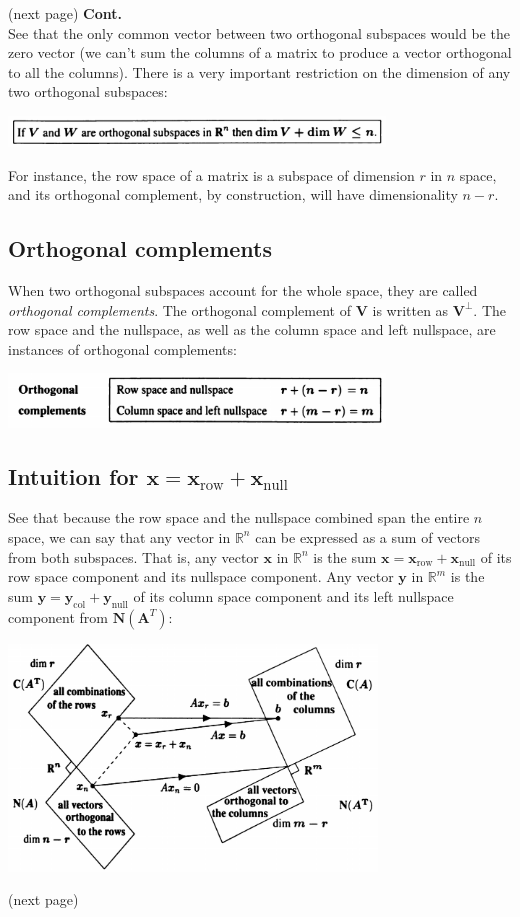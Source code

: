 \documentclass{report}
\begin{document}
(next page)\newpage
\noindent\textbf{Cont.}\\
See that the only common vector between two orthogonal subspaces would be the zero vector (we can't sum the columns of a matrix to produce a vector orthogonal
to all the columns). There is a very important restriction on the dimension of any
two orthogonal subspaces:
\begin{center}
\includegraphics[width=10cm]{51}
\end{center}
For instance, the row space of a matrix is a subspace of dimension $r$ in $n$ space, and its orthogonal complement, by construction, will have dimensionality $n-r$.
\subsection{Orthogonal complements}
When two orthogonal subspaces account for the whole space, they are called \textit{orthogonal complements}. The orthogonal complement of $\bm V$ is written as $\bm V^\perp$.
The row space and the nullspace, as well as the column space and left nullspace, are
instances of orthogonal complements:
\begin{center}
\includegraphics[width=10cm]{52}
\end{center}
\subsection{Intuition for $\bm x=\bm x_\text{row}+\bm x_\text{null}$}
See that because the row space and the nullspace combined span the entire $n$ space, we can say that any vector in $\mathbb{R}^n$ can be expressed as a sum of vectors from 
both subspaces. That is, any vector $\bm x$ in $\mathbb{R}^n$ is the sum $\bm x=\bm x_\text{row}+\bm x_\text{null}$ of its row space component and its nullspace component.
Any vector $\bm y$ in $\mathbb{R}^m$ is the sum $\bm y=\bm y_\text{col}+\bm y_\text{null}$ of its column space component and its left nullspace component from 
$\bm N(\bm A^T)$:
\begin{center}
\includegraphics[width=9.8cm]{53}
\end{center}
(next page)\newpage
\end{document}
